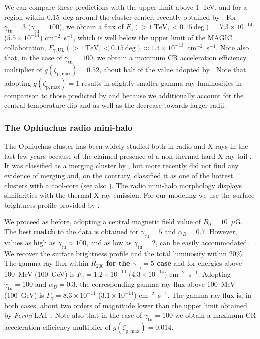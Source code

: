 \documentclass[traditabstract]{aa}
\def\C#1{{\bf #1}}
\newcommand{\rmn}{\mathrm}
\begin{document}
We can compare these predictions with the upper limit above 1~TeV, and for a
region within $0.15$~deg around the cluster center, recently obtained by
\cite{2011arXiv1111.5544M}. For $\gamma_{\rmn{tu}}=3$ ($\gamma_{\rmn{tu}}=100$),
we obtain a flux of $F_{\gamma}(>1~\rmn{TeV},<0.15~\rmn{deg}) = 7.3 \times
10^{-14}$ ($5.5 \times 10^{-14}$) cm$^{-2}$~s$^{-1}$, which is well below the
upper limit of the MAGIC collaboration,
$F_{\gamma,\rmn{UL}}(>1~\rmn{TeV},<0.15~\rmn{deg}) \approx 1.4 \times
10^{-13}$~cm$^{-2}$~s$^{-1}$. Note also that, in the case of $\gamma_{\rmn{tu}}
= 100$, we obtain a maximum CR acceleration efficiency multiplier of
$g(\zeta_{\rmn{p,max}})=0.52$, about half of the value adopted by
\cite{2010MNRAS.409..449P}. Note that adopting $g(\zeta_{\rmn{p,max}})=1$
results in slightly smaller gamma-ray luminosities in comparison to those
predicted by \cite{2010MNRAS.409..449P} and \cite{2011arXiv1105.3240P} because
we additionally account for the central temperature dip and as well as the
decrease towards larger radii.


\subsubsection{The Ophiuchus radio mini-halo}

The Ophiuchus cluster has been widely studied both in radio and X-rays in the
last few years because of the claimed presence of a non-thermal hard X-ray tail
\citep{2008A&A...479...27E,2008PASJ...60.1133F,2009A&A...499..371G,
  2009A&A...499..679M,2009MNRAS.396.2237P,2009A&A...508.1161N,2010A&A...514A..76M,
  2010MNRAS.405.1624M}.  It was classified as a merging cluster by
\cite{2001PASJ...53..605W}, but more recently \cite{2008PASJ...60.1133F} did not
find any evidence of merging and, on the contrary, classified it as one of the
hottest clusters with a cool-core (see also \citealp{2010MNRAS.405.1624M}). The
radio mini-halo morphology displays similarities with the thermal X-ray
emission. For our modeling we use the surface brightness profile provided by
\cite{2009A&A...499..679M}.  

We proceed as before, adopting a central magnetic field value of
$B_{0}=10$~$\mu$G. The best \C{match} to the data is obtained for
$\gamma_{\rmn{tu}}=5$ and $\alpha_B=0.7$. However, values as high as
$\gamma_{\rmn{tu}} \approx 100$, and as low as $\gamma_{\rmn{tu}}=2$, can be
easily accommodated. We recover the surface brightness profile and the total
luminosity within $20\%$. The gamma-ray flux within $R_{200}$ \C{for the $\gamma_{\rmn{tu}}=5$
case} and for energies above 100~MeV (100~GeV) is $F_{\gamma} = 1.2 \times
10^{-10}$ ($4.3 \times 10^{-14}$) cm$^{-2}$~s$^{-1}$. Adopting
$\gamma_{\rmn{tu}}=100$ and $\alpha_B=0.3$, the corresponding gamma-ray flux
above 100~MeV (100~GeV) is $F_{\gamma} = 8.3 \times 10^{-11}$ ($3.1 \times
10^{-14}$) cm$^{-2}$~s$^{-1}$. The gamma-ray flux is, in both cases, about two
orders of magnitude lower than the upper limit obtained by \emph{Fermi}-LAT
\citep{2010ApJ...717L..71A}. Note also that in the case of $\gamma_{\rmn{tu}} =
100$ we obtain a maximum CR acceleration efficiency multiplier of
$g(\zeta_{\rmn{p,max}})=0.014$.
\end{document}

